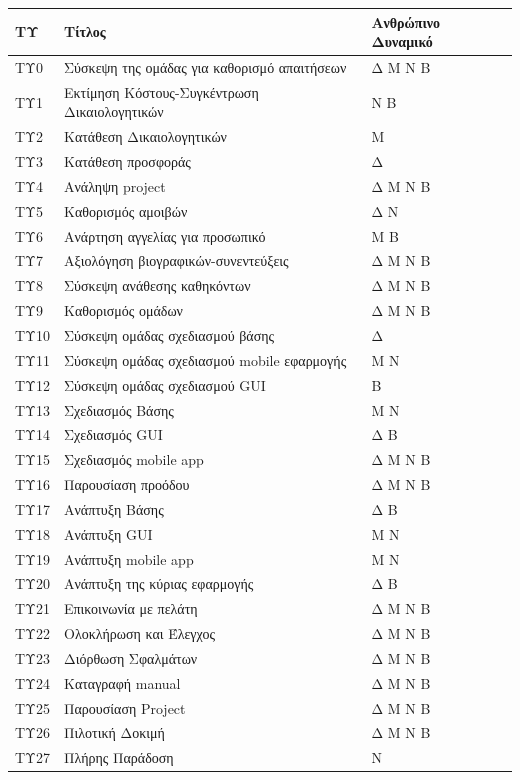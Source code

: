 \documentclass[12pt,a4paper,oneside]{article}
\begin{document}
\begin{tabular}{ |p{4cm}|p{6cm}|p{4cm}|}
\arrayrulecolor{gray}
 \hline
 
 \hline
 \textbf{ΤΥ} & \textbf{Τίτλος} & \textbf{Ανθρώπινο Δυναμικό}\\
 \hline
ΤΥ0 & Σύσκεψη της ομάδας για καθορισμό απαιτήσεων & Δ Μ Ν Β\\
\hline
ΤΥ1 & Εκτίμηση Κόστους-Συγκέντρωση Δικαιολογητικών & Ν Β\\
\hline
ΤΥ2 & 	Κατάθεση Δικαιολογητικών & Μ\\
\hline
ΤΥ3 & Κατάθεση προσφοράς & Δ\\
\hline
ΤΥ4 & Ανάληψη project &	Δ Μ Ν Β\\
\hline
ΤΥ5 & Καθορισμός αμοιβών &	Δ Ν\\
\hline
ΤΥ6 & Ανάρτηση αγγελίας για προσωπικό & Μ Β\\ 
\hline
ΤΥ7 &Αξιολόγηση βιογραφικών-συνεντεύξεις&Δ Μ Ν Β \\
\hline
ΤΥ8 & Σύσκεψη ανάθεσης καθηκόντων&Δ Μ Ν Β\\
\hline
ΤΥ9 & Καθορισμός ομάδων&Δ Μ Ν Β\\
\hline
ΤΥ10 & Σύσκεψη ομάδας σχεδιασμού βάσης&Δ\\
\hline
ΤΥ11 & Σύσκεψη ομάδας σχεδιασμού mobile εφαρμογής&Μ Ν\\
\hline
ΤΥ12 &Σύσκεψη ομάδας σχεδιασμού GUI	&Β\\
\hline
ΤΥ13 &Σχεδιασμός Βάσης&Μ Ν\\
\hline
ΤΥ14 &	Σχεδιασμός GUI&Δ Β\\
\hline
ΤΥ15 & Σχεδιασμός mobile app&Δ Μ Ν Β\\
\hline
ΤΥ16 & Παρουσίαση προόδου&Δ Μ Ν Β\\
\hline
ΤΥ17 &Ανάπτυξη Βάσης&Δ Β\\
\hline
ΤΥ18 & Ανάπτυξη GUI	&Μ Ν\\
\hline
ΤΥ19 & Ανάπτυξη mobile app&Μ Ν\\
\hline
ΤΥ20 & Ανάπτυξη της κύριας εφαρμογής&Δ Β\\
\hline
ΤΥ21 & Επικοινωνία με πελάτη&Δ Μ Ν Β\\
\hline
ΤΥ22 & Ολοκλήρωση και Έλεγχος&Δ Μ Ν Β\\
\hline
ΤΥ23 & Διόρθωση Σφαλμάτων&Δ Μ Ν Β\\
\hline
ΤΥ24 & Καταγραφή manual&Δ Μ Ν Β\\
\hline
ΤΥ25 & Παρουσίαση Project&Δ Μ Ν Β\\
\hline
ΤΥ26 & Πιλοτική Δοκιμή&Δ Μ Ν Β\\
\hline
ΤΥ27 &Πλήρης Παράδοση&Ν\\
\hline 

\end{tabular}
\newpage
\end{document}
